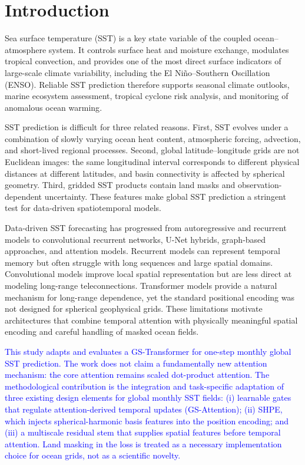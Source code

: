 \documentclass[published]{agujournal2025}
\newcommand{\rev}[1]{\textcolor{blue}{#1}}
\begin{document}
\section{Introduction}
Sea surface temperature (SST) is a key state variable of the coupled ocean--atmosphere system. It controls surface heat and moisture exchange, modulates tropical convection, and provides one of the most direct surface indicators of large-scale climate variability, including the El Ni\~no--Southern Oscillation (ENSO)\cite{ham2021unified,cai2021changing}. Reliable SST prediction therefore supports seasonal climate outlooks, marine ecosystem assessment, tropical cyclone risk analysis, and monitoring of anomalous ocean warming\cite{wang2021interdecadal,taylor2022deep,cui2023predicting}.

SST prediction is difficult for three related reasons. First, SST evolves under a combination of slowly varying ocean heat content, atmospheric forcing, advection, and short-lived regional processes. Second, global latitude--longitude grids are not Euclidean images: the same longitudinal interval corresponds to different physical distances at different latitudes, and basin connectivity is affected by spherical geometry. Third, gridded SST products contain land masks and observation-dependent uncertainty. These features make global SST prediction a stringent test for data-driven spatiotemporal models.

Data-driven SST forecasting has progressed from autoregressive and recurrent models to convolutional recurrent networks, U-Net hybrids, graph-based approaches, and attention models\cite{jia2022prediction,su2019estimating,shi2015convolutional,xie2024intelligent,taylor2022deep,zhang2017prediction,fu2024lstm}. Recurrent models can represent temporal memory but often struggle with long sequences and large spatial domains. Convolutional models improve local spatial representation but are less direct at modeling long-range teleconnections. Transformer models provide a natural mechanism for long-range dependence\cite{vaswani2017attention,gao2023transformer}, yet the standard positional encoding was not designed for spherical geophysical grids\cite{mai2022review,russwurm2310geographic}. These limitations motivate architectures that combine temporal attention with physically meaningful spatial encoding and careful handling of masked ocean fields.

\rev{This study adapts and evaluates a GS-Transformer for one-step monthly global SST prediction. The work does not claim a fundamentally new attention mechanism: the core attention remains scaled dot-product attention\cite{vaswani2017attention}. The methodological contribution is the integration and task-specific adaptation of three existing design elements for global monthly SST fields: (i) learnable gates that regulate attention-derived temporal updates (GS-Attention); (ii) SHPE, which injects spherical-harmonic basis features into the position encoding; and (iii) a multiscale residual stem that supplies spatial features before temporal attention. Land masking in the loss is treated as a necessary implementation choice for ocean grids, not as a scientific novelty.}
\end{document}
